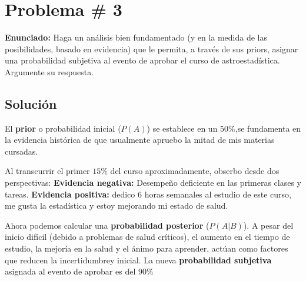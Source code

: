 \documentclass[a4paper]{article}
\begin{document}
\section{Problema \# 3}
\textbf{Enunciado:}
Haga un análisis bien fundamentado (y en la medida de las posibilidades, basado en evidencia) que le permita, a través de sus priors, asignar una probabilidad subjetiva al evento de aprobar el curso de astroestadística. Argumente su respuesta.

\subsection*{Solución}

El \textbf{prior} o probabilidad inicial ($P(A)$) se establece en un $50\%$,se fundamenta en la evidencia histórica de que usualmente apruebo la mitad de mis materias cursadas.

Al transcurrir el primer $15\%$ del curso aproximadamente, obserbo desde dos perspectivas: \textbf{Evidencia negativa:} Desempeño deficiente en las primeras clases y tareas. \textbf{Evidencia positiva:} dedico 6 horas semanales al estudio de este curso, me gusta la estadística y estoy mejorando mi estado de salud.

Ahora podemos calcular una \textbf{probabilidad posterior} ($P(A|B)$). A pesar del inicio difícil (debido a problemas de salud críticos), el aumento en el tiempo de estudio, la mejoría en la salud y el ánimo para aprender, actúan como factores que reducen la incertidumbrey inicial. La nueva \textbf{probabilidad subjetiva} asignada al evento de aprobar es del $90\%$



 
\end{document}

